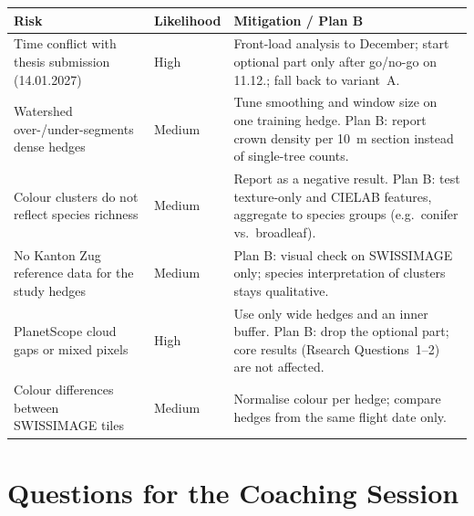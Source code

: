 \documentclass[10pt,a4paper]{article}
\begin{document}
{\footnotesize
\begin{tabularx}{\textwidth}{@{}
  >{\raggedright\arraybackslash}p{4.4cm}
  >{\raggedright\arraybackslash}p{1.6cm}
  >{\raggedright\arraybackslash}X@{}}
\toprule
\textbf{Risk} & \textbf{Likelihood} &
  \textbf{Mitigation / Plan B} \\
\midrule
Time conflict with thesis submission (14.01.2027)
  & High
  & Front-load analysis to December; start optional
    part only after go/no-go on 11.12.; fall back to
    variant~A. \\
Watershed over-/under-segments dense hedges
  & Medium
  & Tune smoothing and window size on one training
    hedge. Plan B: report crown density per 10~m
    section instead of single-tree counts. \\
Colour clusters do not reflect species richness
  & Medium
  & Report as a negative result. Plan B: test
    texture-only and CIELAB features, aggregate to
    species groups (e.g.\ conifer vs.\ broadleaf). \\
No Kanton Zug reference data for the study hedges
  & Medium
  & Plan B: visual check on SWISSIMAGE only; species
    interpretation of clusters stays qualitative. \\
PlanetScope cloud gaps or mixed pixels
  & High
  & Use only wide hedges and an inner buffer.
    Plan B: drop the optional part; core results
    (Rsearch Questions~1--2) are not affected. \\
Colour differences between SWISSIMAGE tiles
  & Medium
  & Normalise colour per hedge; compare hedges from the
    same flight date only. \\
\bottomrule
\end{tabularx}
}


\section*{Questions for the Coaching Session}
\end{document}
